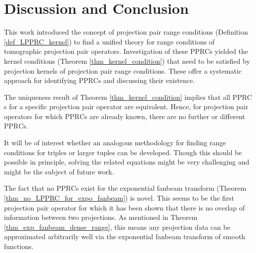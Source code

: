 \documentclass[12pt]{article}
\newcommand{\conditionname}{$\mathrm{PPRC}$}
\begin{document}
\section*{Discussion and Conclusion}
This work introduced the concept of projection pair range conditions (Definition \ref{def_LPPRC_kernel}) to find a unified theory for range conditions of tomographic projection pair operators. 
 Investigation of these \conditionname s yielded the kernel conditions (Theorem \ref{thm_kernel_condition}) that need to be satisfied by projection kernels of projection pair range conditions. These offer a systematic approach for identifying \conditionname s and discussing their existence.


The uniqueness result of Theorem \ref{thm_kernel_condition} implies that all \conditionname s for a specific projection pair operator are equivalent. Hence, for projection pair operators for which \conditionname s are already known, there are no further or different \conditionname s.

 It will be of interest whether an analogous methodology for finding range conditions for triples or larger tuples can be developed. Though this should be possible in principle, solving the related equations might be very challenging and might be the subject of future work.
 
The fact that no \conditionname s exist for the exponential fanbeam transform  (Theorem \ref{thm_no_LPPRC_for_expo_fanbeam}) is novel. This seems to be the first projection pair operator for which it has been shown that there is no overlap of information between two projections.
As mentioned in Theorem \ref{thm_exp_fanbeam_dense_range}, this means any projection data can be approximated arbitrarily well via the exponential fanbeam transform of smooth functions.
\end{document}
